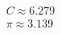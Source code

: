 \documentclass[preview]{standalone}
\begin{document}
\begin{align*}
C \approx 6.279 \\\pi \approx 3.139
\end{align*}
\end{document}
